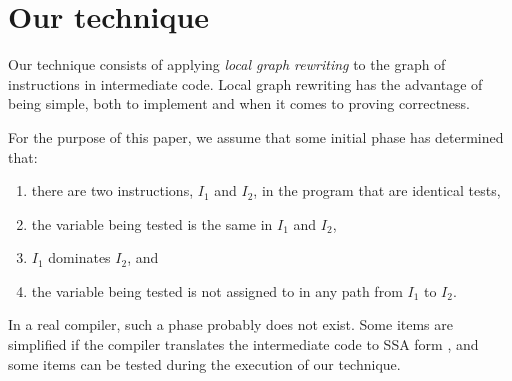 \section{Our technique}

Our technique consists of applying \emph{local graph rewriting} to the
graph of instructions in intermediate code.  Local graph rewriting has
the advantage of being simple, both to implement and when it comes to
proving correctness.

For the purpose of this paper, we assume that some initial phase has
determined that:

\begin{enumerate}
\item there are two instructions, $I_1$ and $I_2$, in the program that
  are identical tests,
\item the variable being tested is the same in $I_1$ and $I_2$,
\item $I_1$ dominates $I_2$, and
\item the variable being tested is not assigned to in any path from
  $I_1$ to $I_2$.
\end{enumerate}

In a real compiler, such a phase probably does not exist.  Some items
are simplified if the compiler translates the intermediate code to SSA
form \cite{Cytron:1989:EMC:75277.75280,
  Cytron:1991:ECS:115372.115320}, and some items can be tested during
the execution of our technique.
